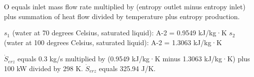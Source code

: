O equals inlet mass flow rate multiplied by (entropy outlet minus entropy inlet) plus summation of heat flow divided by temperature plus entropy production.  

\( s_1 \) (water at 70 degrees Celsius, saturated liquid): A-2 = 0.9549 kJ/kg·K  
\( s_2 \) (water at 100 degrees Celsius, saturated liquid): A-2 = 1.3063 kJ/kg·K  

\( \dot{S}_{erz} \) equals 0.3 kg/s multiplied by (0.9549 kJ/kg·K minus 1.3063 kJ/kg·K) plus 100 kW divided by 298 K.  
\( \dot{S}_{erz} \) equals 325.94 J/K.